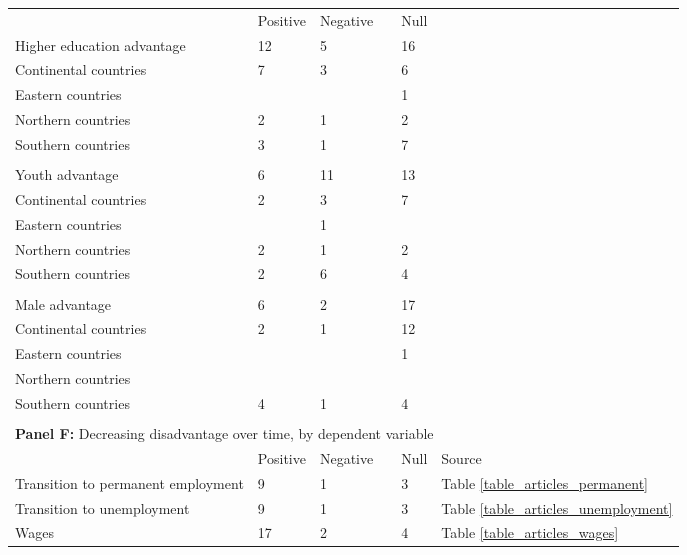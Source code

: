 \begin{tabular}{llllll}
                     \phantom{Column1} & Positive     & Negative      & \phantom{Mixed}  & Null  & \phantom{Source} \\\cmidrule(lr){2-5}Higher education advantage  & 12 &  5 &  & 16 &  \\ 
  \hspace{10mm} Continental countries &  7 &  3 &  &  6 &  \\ 
  \hspace{10mm} Eastern countries &  &  &  &  1 &  \\ 
  \hspace{10mm} Northern countries &  2 &  1 &  &  2 &  \\ 
  \hspace{10mm} Southern countries &  3 &  1 &  &  7 &  \\ 
  \\[-1.8ex]   
                     Youth advantage &  6 & 11 &  & 13 &  \\ 
  \hspace{10mm} Continental countries  &  2 &  3 &  &  7 &  \\ 
  \hspace{10mm} Eastern countries  &  &  1 &  &  &  \\ 
  \hspace{10mm} Northern countries  &  2 &  1 &  &  2 &  \\ 
  \hspace{10mm} Southern countries  &  2 &  6 &  &  4 &  \\ 
  \\[-1.8ex]   
                     Male advantage &  6 &  2 &  & 17 &  \\ 
  \hspace{10mm} Continental countries   &  2 &  1 &  & 12 &  \\ 
  \hspace{10mm} Eastern countries   &  &  &  &  1 &  \\ 
  \hspace{10mm} Northern countries   &  &  &  &  &  \\ 
  \hspace{10mm} Southern countries   &  4 &  1 &  &  4 &  \\ 
   \hline \\[-1.8ex]   
                     \multicolumn{6}{l}{{\bf Panel F:} Decreasing disadvantage over time, by dependent variable} \\ 

                     \phantom{Column1} & Positive     & Negative      & \phantom{Mixed}  & Null  &  Source \\ \cmidrule(lr){2-6}Transition to permanent employment  &  9 & 1 &  & 3 & Table \ref{table_articles_permanent} \\ 
  Transition to unemployment  &  9 & 1 &  & 3 & Table \ref{table_articles_unemployment} \\ 
  Wages  & 17 & 2 &  & 4 & Table \ref{table_articles_wages} \\ 
   \hline 
\end{tabular}
